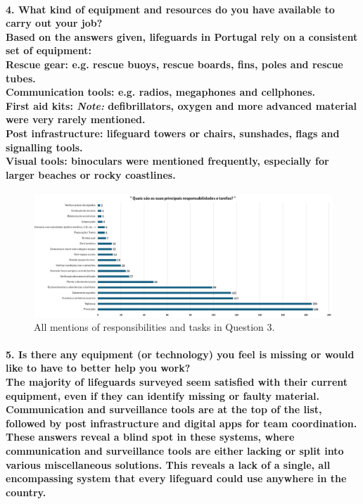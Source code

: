 \paragraph{
\textbf{4. What kind of equipment and resources do you have available to carry out your job?}
\\
Based on the answers given, lifeguards in Portugal rely on a consistent set of equipment:
\\
\textbf{Rescue gear:} e.g. rescue buoys, rescue boards, fins, poles and rescue tubes.\\
\textbf{Communication tools:} e.g. radios, megaphones and cellphones.\\
\textbf{First aid kits:} \textit{Note:} defibrillators, oxygen and more advanced material were very rarely mentioned.\\
\textbf{Post infrastructure:} lifeguard towers or chairs, sunshades, flags and signalling tools.\\
\textbf{Visual tools:} binoculars were mentioned frequently, especially for larger beaches or rocky coastlines.}

\begin{figure}[H]
      \centering
      \includegraphics[width=15cm]{figs/questiongraf/image4.png}
      \caption{All mentions of responsibilities and tasks in Question 3.}
      \label{fig:question3}
\end{figure}

\paragraph{
\textbf{5. Is there any equipment (or technology) you feel is missing or would like to have to better help you work?}
\\
The majority of lifeguards surveyed seem satisfied with their current equipment, even if they can identify missing or faulty material. Communication and surveillance tools are at the top of the list, followed by post infrastructure and digital apps for team coordination. 
\\
These answers reveal a blind spot in these systems, where communication and surveillance tools are either lacking or split into various miscellaneous solutions. This reveals a lack of a single, all encompassing system that every lifeguard could use anywhere in the country.}


